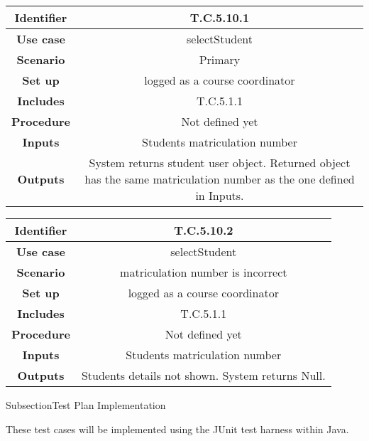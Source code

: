 \begin{tabular}{|c|c|}
\hline \textbf{Identifier} & T.C.5.10.1\\
\hline \textbf{Use case} & selectStudent\\
\hline \textbf{Scenario} & Primary\\
\hline \textbf{Set up} & logged as a course coordinator\\
\hline \textbf{Includes} & T.C.5.1.1\\
\hline \textbf{Procedure} & Not defined yet\\
\hline \textbf{Inputs} & Students matriculation number\\
\hline \textbf{Outputs} & System returns student user object. Returned object has the same matriculation number as the one defined in Inputs.\\
\hline
\end{tabular}

\begin{tabular}{|c|c|}
\hline \textbf{Identifier} & T.C.5.10.2\\
\hline \textbf{Use case} & selectStudent\\
\hline \textbf{Scenario} & matriculation number is incorrect\\
\hline \textbf{Set up} & logged as a course coordinator\\
\hline \textbf{Includes} & T.C.5.1.1\\
\hline \textbf{Procedure} & Not defined yet\\
\hline \textbf{Inputs} & Students matriculation number\\
\hline \textbf{Outputs} & Students details not shown. System returns Null.\\
\hline
\end{tabular}

Subsection{Test Plan Implementation}

These test cases will be implemented using the JUnit test harness within Java. 



